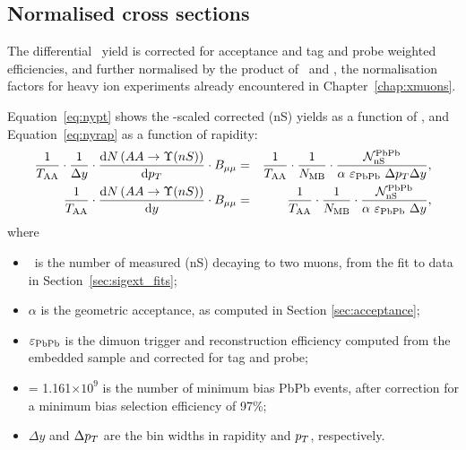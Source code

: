 \subsection{Normalised cross sections}

\label{subsec:csaa}
The differential \PgU\ yield is corrected for acceptance and tag and
probe weighted efficiencies, and further normalised by the product of
\NMB\ and \TAA, the normalisation factors for heavy ion experiments
already encountered in Chapter~\ref{chap:xmuons}.%

Equation~\ref{eq:nypt} shows the \TAA-scaled corrected \PgU(nS) yields
as a function of \pt, and Equation~\ref{eq:nyrap}
as a function of rapidity:
\begin{eqnarray} 
\label{eq:nypt}
\dfrac{1}{T_{\rm AA}} \cdot \dfrac{1}{\Delta y} \cdot \dfrac{\text{d}N\left( AA\rightarrow
 \Upsilon(nS)\right)}{\text{d}p_{T}} \cdot B_{\mu\mu} &=&
 \dfrac{1}{T_{\rm AA}}\cdot
 \dfrac{1}{N_{\rm MB}}\cdot\dfrac{{\cal N}_{\rm nS}^{\rm PbPb}}{\alpha\ \varepsilon_{\rm PbPb}\
 \Delta p_{T}\Delta y}, \\
\label{eq:nyrap}
\dfrac{1}{T_{\rm AA}} \cdot \dfrac{\text{d}N\left( AA\rightarrow
 \Upsilon(nS)\right)}{\text{d}y} \cdot B_{\mu\mu} &=&
 \dfrac{1}{T_{\rm AA}} \cdot
  \dfrac{1}{N_{\rm MB}} \cdot \dfrac{{\cal N}_{\rm nS}^{\rm PbPb}}{\alpha\ \varepsilon_{\rm PbPb}\ \Delta y}, 
 \end{eqnarray}    
% 
where
\begin{itemize}
\item{\NFitnSPbPb\ is the number of measured \PgU(nS) decaying to
    two muons, from the fit
    to data in Section~\ref{sec:sigext_fits};}
\item{$\alpha$ is the geometric acceptance, as computed in Section
    \ref{sec:acceptance};}
\item{$\varepsilon_{\rm PbPb}$ is the dimuon trigger and reconstruction
    efficiency computed from the embedded sample and corrected for tag and probe;}
\item{\NMB = 1.161$\times 10^{9}$ is the number of minimum bias
    PbPb events, after correction for a minimum bias selection efficiency
    of 97\%;}
\item{$\Delta y$ and $\Delta p_{T}$ are the bin widths in rapidity and
    $p_{T}$, respectively.}
\end{itemize}

